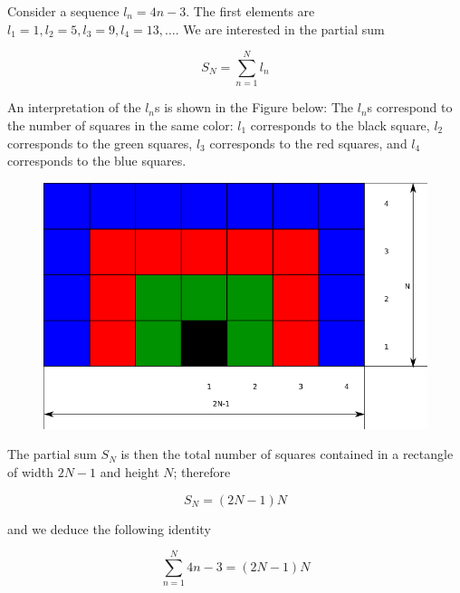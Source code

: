 
Consider a sequence \(l_n = 4n-3\). The first elements are
\(l_1=1, l_2=5, l_3=9, l_4=13,\ldots\). We are interested in the partial
sum

\[
S_N = \sum_{n=1}^N l_n
\]

An interpretation of the \(l_n\)s is shown in the Figure below: The
\(l_n\)s correspond to the number of squares in the same color: \(l_1\)
corresponds to the black square, \(l_2\) corresponds to the green
squares, \(l_3\) corresponds to the red squares, and \(l_4\) corresponds
to the blue squares.

\begin{figure}[H]
\centering
\includegraphics[scale=0.5]{images/tilings_01.png}
\end{figure}

The partial sum \(S_N\) is then the total number of squares contained in
a rectangle of width \(2N-1\) and height \(N\); therefore

\[
S_N = (2N-1)N
\]

and we deduce the following identity

\[
\sum_{n=1}^N 4n-3 = (2N-1)N
\]
